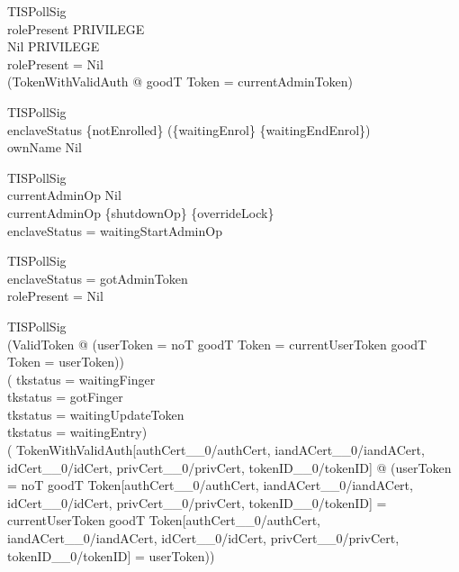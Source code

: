 TISPollSig \\
         \land rolePresent \in \power PRIVILEGE \\
         \land Nil \in \power PRIVILEGE \\
         \land \lnot rolePresent = Nil \\
\implies (\exists TokenWithValidAuth @ goodT \theta Token = currentAdminToken)

 TISPollSig \\
         \land enclaveStatus
               \notin \{notEnrolled\}
                      \cup (\{waitingEnrol\} \cup \{waitingEndEnrol\}) \\
\implies ownName \neq Nil

 TISPollSig \\
         \land currentAdminOp \neq Nil \\
         \land \The currentAdminOp \in \{shutdownOp\} \cup \{overrideLock\} \\
\implies enclaveStatus = waitingStartAdminOp

  TISPollSig \\
         \land enclaveStatus = gotAdminToken \\
\implies rolePresent = Nil

 TISPollSig \\
         \land \lnot (\exists ValidToken
                        @ (\IF userToken = noT
                           \THEN goodT \theta Token = currentUserToken
                           \ELSE goodT \theta Token = userToken)) \\
         \land (     tkstatus = waitingFinger \\
                \lor tkstatus = gotFinger \\
                \lor tkstatus = waitingUpdateToken \\
                \lor tkstatus = waitingEntry) \\
\implies
(\exists
   TokenWithValidAuth[authCert\_\_0/authCert, iandACert\_\_0/iandACert,
                      idCert\_\_0/idCert, privCert\_\_0/privCert,
                      tokenID\_\_0/tokenID]
   @ (\IF userToken = noT
      \THEN
      goodT
      \theta
        Token[authCert\_\_0/authCert, iandACert\_\_0/iandACert,
              idCert\_\_0/idCert, privCert\_\_0/privCert, tokenID\_\_0/tokenID]
      = currentUserToken
      \ELSE
      goodT
      \theta
        Token[authCert\_\_0/authCert, iandACert\_\_0/iandACert,
              idCert\_\_0/idCert, privCert\_\_0/privCert, tokenID\_\_0/tokenID]
      = userToken))


